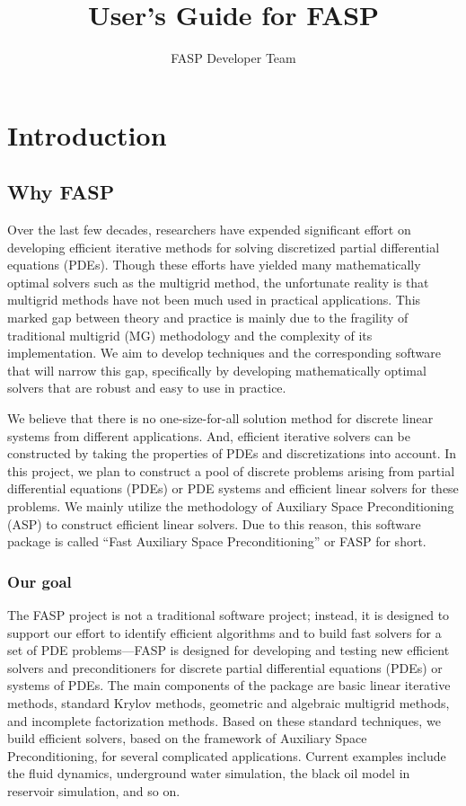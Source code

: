 \documentclass[11pt]{memoir}
\title{User's Guide for FASP}
\author{FASP Developer Team}
\begin{document}
\maketitle

\newpage
\tableofcontents

\chapter{Introduction}\label{ch:intro}

\section{Why FASP}

Over the last few decades, researchers have expended significant effort on developing efficient iterative methods for solving discretized partial differential equations (PDEs). Though these efforts have yielded many mathematically optimal solvers such as the multigrid method, the unfortunate reality is that multigrid methods have not been much used in practical applications. This marked gap between theory and practice is mainly due to the fragility of traditional multigrid (MG) methodology and the complexity of its implementation. We aim to develop techniques and the corresponding software that will narrow this gap, specifically by developing mathematically optimal solvers that are robust and easy to use in practice. 

We believe that there is no one-size-for-all solution method for discrete linear systems from different applications. And, efficient iterative solvers can be constructed by taking the properties of PDEs and discretizations into account. In this project, we plan to construct a pool of discrete problems arising from partial differential equations (PDEs) or PDE systems and efficient linear solvers for these problems. We mainly utilize the methodology of Auxiliary Space Preconditioning (ASP) to construct efficient linear solvers. Due to this reason, this software package is called ``Fast Auxiliary Space Preconditioning'' or FASP for short. 

\subsection{Our goal}

The FASP project is not a traditional software project; instead, it is designed to support our effort to identify efficient algorithms and to build fast solvers for a set of PDE problems---FASP is designed for developing and testing new efficient solvers and preconditioners for discrete partial differential equations (PDEs) or systems of PDEs. The main components of the package are basic linear iterative methods, standard Krylov methods, geometric and algebraic multigrid methods, and incomplete factorization methods. Based on these standard techniques, we build efficient solvers, based on the framework of Auxiliary Space Preconditioning, for several complicated applications. Current examples include the fluid dynamics, underground water simulation, the black oil model in reservoir simulation, and so on. 
\end{document}
